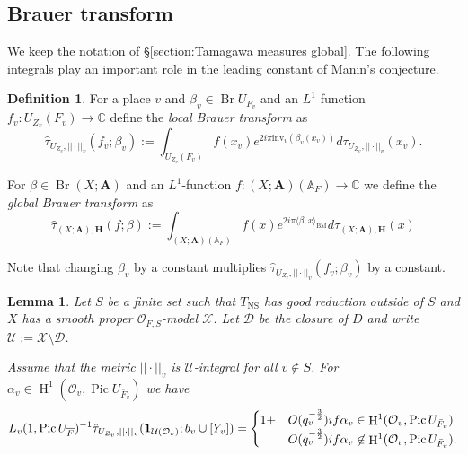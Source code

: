 \documentclass[a4paper,11pt,reqno]{amsart}
\newcommand{\C}{\mathbb{C}}
\newcommand{\A}{\mathbb{A}}
\DeclareMathOperator{\Pic}{Pic}
\DeclareMathOperator{\NS}{NS}
\DeclareMathOperator{\Br}{Br}
\DeclareMathOperator{\HH}{H}
\newtheorem{lemma}[theorem]{Lemma}
\theoremstyle{definition}
\newtheorem{definition}[theorem]{Definition}
\begin{document}
\subsection{Brauer transform}
We keep the notation of \S\ref{section:Tamagawa measures global}. The following integrals play an important role in the leading constant of Manin's conjecture.
\begin{definition}
	For a place $v$ and $\beta_v \in \Br U_{F_v}$ and an $L^1$ function $f_v: U_{Z_v}(F_v) \to \C$ define the \emph{local Brauer transform} as
	\[
	\hat{\tau}_{U_{Z_v}, ||\cdot||_v}(f_v ; \beta_v) := \int_{U_{Z_v}(F_v)} f(x_v) e^{2 i \pi \mathrm{inv}_v(\beta_v(x_v))} d\tau_{U_{Z_v}, ||\cdot||_v}(x_v).
	\]
	
	For $\beta \in \Br (X ; \mathbf{A})$ and an $L^1$-function $f: (X ; \mathbf{A})(\A_F) \to \C$ we define the \emph{global Brauer transform} as
	\[
	\hat{\tau}_{(X ; \mathbf{A}), \mathbf{H}}(f ; \beta) := \int_{(X ; \mathbf{A})(\A_F)} f(x) e^{2 i \pi \langle \beta, x \rangle_{\text{BM}}} d\tau_{(X ; \mathbf{A}), \mathbf{H}}(x)
	\]
\end{definition}
Note that changing $\beta_v$ by a constant multiplies $\hat{\tau}_{U_{Z_v}, ||\cdot||_v}(f_v ; \beta_v)$ by a constant.
\begin{lemma}\label{lem:estimates for local Brauer transform}
	Let $S$ be a finite set such that $T_{\NS}$ has good reduction outside of $S$ and $X$ has a smooth proper $\mathcal{O}_{F, S}$-model $\mathcal{X}$.
	Let $\mathcal{D}$ be the closure of $D$ and write $\mathcal{U} := \mathcal{X} \setminus \mathcal{D}$. 
	
	 Assume that the metric $||\cdot||_v$ is $\mathcal{U}$-integral for all $v \not \in S$. For $\alpha_v \in \HH^1(\mathcal{O}_v, \Pic U_{\bar{F}_v})$ we have
	\[
	L_v(1, \Pic U_{\overline{F}})^{-1} \hat{\tau}_{U_{Z_v}, ||\cdot||_v}
	(\mathbf{1}_{\mathcal{U}(\mathcal{O}_v)} ; b_v \cup [Y_v]) = 
	\begin{cases}
		1 + &O(q_v^{-\frac{3}{2}}) \emph{ if } \alpha_v \in \HH^1(\mathcal{O}_v, \Pic U_{\bar{F}_v}) \\
		&O(q_v^{-\frac{3}{2}}) \emph{ if } \alpha_v \not \in \HH^1(\mathcal{O}_v, \Pic U_{\bar{F}_v}).
	\end{cases}
	\]
\end{lemma}
\end{document}

